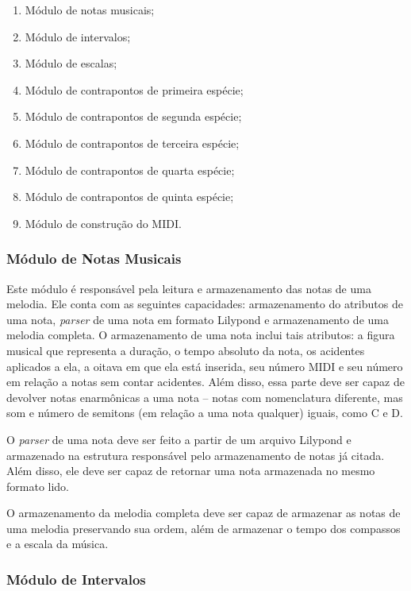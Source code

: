     \begin{enumerate}
      \item Módulo de notas musicais;
      \item Módulo de intervalos;
      \item Módulo de escalas;
      \item Módulo de contrapontos de primeira espécie;
      \item Módulo de contrapontos de segunda espécie;
      \item Módulo de contrapontos de terceira espécie;
      \item Módulo de contrapontos de quarta espécie;
      \item Módulo de contrapontos de quinta espécie;
      \item Módulo de construção do MIDI.
    \end{enumerate}

    \subsubsection[Módulo de Notas Musicais]{Módulo de Notas Musicais}

      Este módulo é responsável pela leitura e armazenamento das notas de uma melodia. Ele conta com as seguintes capacidades: armazenamento do atributos de uma nota, \textit{parser} de uma nota em formato Lilypond e armazenamento de uma melodia completa. O armazenamento de uma nota inclui tais atributos: a figura musical que representa a duração, o tempo absoluto da nota, os acidentes aplicados a ela, a oitava em que ela está inserida, seu número MIDI e seu número em relação a notas sem contar acidentes. Além disso, essa parte deve ser capaz de devolver notas enarmônicas a uma nota -- notas com nomenclatura diferente, mas som e número de semitons (em relação a uma nota qualquer) iguais, como C\sh{}  e D\fl.

      O \textit{parser} de uma nota deve ser feito a partir de um arquivo Lilypond e armazenado na estrutura responsável pelo armazenamento de notas já citada. Além disso, ele deve ser capaz de retornar uma nota armazenada no mesmo formato lido.

      O armazenamento da melodia completa deve ser capaz de armazenar as notas de uma melodia preservando sua ordem, além de armazenar o tempo dos compassos e a escala da música.

    \subsubsection[Módulo de Intervalos]{Módulo de Intervalos}

